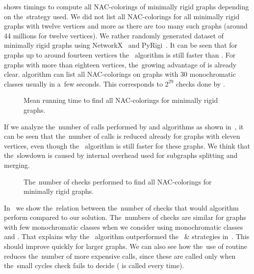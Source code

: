 shows timings to compute all NAC-colorings of minimally rigid graphs
depending on the~strategy used.
We did not list all NAC-colorings for all minimally rigid graphs with twelve vertices and more
as there are too many such graphs (around 44 millions for twelve vertices).
%
We rather randomly generated dataset of minimally rigid graphs
using NetworkX~\cite{networkx} and PyRigi~\cite{pyrigi}.
%
It can be seen that for graphs up to around fourteen vertices the~\NaiveCycles{} algorithm
is still faster than \Subgraphs{}.
For graphs with more than eighteen vertices,
the~growing advantage of \Subgraphs{} is already clear.
\Subgraphs{} algorithm can list all NAC-colorings on graphs with 30 monochromatic classes
usually in a~few seconds.
This corresponds to \( 2^{29} \) checks done by \NaiveCycles{}.

\begin{figure}[ht]
	\centering
	\scalebox{\BenchFigureScale}{}
	\caption[Running time for minimally rigid graphs]{
		Mean running time to find all NAC-colorings for minimally rigid graphs.}%
	\label{fig:graph_time_minimally_rigid}
\end{figure}%

If we analyze the~number of \IsNACColoring{} calls performed by \NaiveCycles{} and \Subgraphs{} algorithms
as shown in~,
it can be seen that the~number of \IsNACColoring{} calls is reduced already for graphs
with eleven vertices,
even though the~\NaiveCycles{} algorithm is still faster for these graphs.
%
We think that the~slowdown is caused by internal overhead
used for subgraphs splitting and merging.

\begin{figure}[ht]
	\centering
	\scalebox{\BenchFigureScale}{}
	\caption[Checks performed for minimally rigid graphs]{
		The~number of checks performed to find all NAC-colorings for minimally rigid graphs.}%
	\label{fig:graph_count_minimally_rigid}
\end{figure}%

In~
we show the~relation between the~number of \IsNACColoring{} checks that
would \Naive{} algorithm perform compared to our solution.
%
The~numbers of checks are similar for graphs with few monochromatic classes
when we consider \NaiveCycles{} using monochromatic classes and \Subgraphs{}.
That explains why the~\NaiveCycles{} algorithm outperformed
the~\NeighborsDegree{} \& \MergeLinear{} strategies in~. This should improve quickly for larger graphs.
We can also see how the~use of \CycleMask{} routine
reduces the~number of more expensive \IsNACColoring{} calls,
since these are called only when the~small cycles check \CycleMask{} fails to decide
(\CycleMask{} is called every time).

